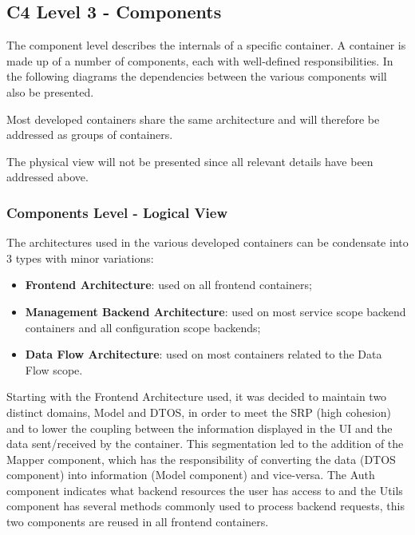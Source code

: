 \subsection{C4 Level 3 - Components}
\label{subsec:design:architecture:components}

The component level describes the internals of a specific container. A container is made up of a number of components, each with well-defined responsibilities. In the following diagrams the dependencies between the various components will also be presented.

Most developed containers share the same architecture and will therefore be addressed as groups of containers.

The physical view will not be presented since all relevant details have been addressed above.

\subsubsection*{Components Level - Logical View}
\label{subsubsec:design:architecture:components:logical}

The architectures used in the various developed containers can be condensate into 3 types with minor variations:

\begin{itemize}
   \item \textbf{Frontend Architecture}: used on all frontend containers;
   \item \textbf{Management Backend Architecture}: used on most service scope backend containers and all configuration scope backends; 
   \item \textbf{Data Flow Architecture}: used on most containers related to the Data Flow scope.
\end{itemize}

Starting with the Frontend Architecture used, it was decided to maintain two distinct domains, Model and DTOS, in order to meet the \gls{SRP} (high cohesion) and to lower the coupling between the information displayed in the UI and the data sent/received by the container. This segmentation led to the addition of the Mapper component, which has the responsibility of converting the data (DTOS component) into information (Model component) and vice-versa. The Auth component indicates what backend resources the user has access to and the Utils component has several methods commonly used to process backend requests, this two components are reused in all frontend containers.


